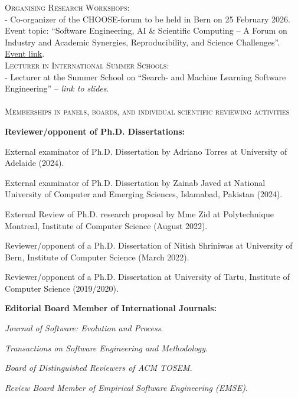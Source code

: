 \documentclass[11pt]{article}
\begin{document}
\textsc{Organising Research Workshops:}
\medskip \\ 
- Co-organizer of the CHOOSE-forum to be held in Bern on 25 February 2026. Event topic: ``Software Engineering, AI \& Scientific Computing -- A Forum on Industry and Academic Synergies, Reproducibility, and Science Challenges''. \href{https://se2026.inf.unibe.ch/en/choose-forum/}{Event link}.\\


\textsc{Lecturer in International Summer Schools:}
\medskip \\
- Lecturer at the Summer School on ``Search- and Machine Learning Software Engineering'' – \textit{link to slides}.\\

\medskip\medskip \\
\textsc{Memberships in panels, boards, and individual scientific reviewing activities}

\medskip 

\textbf{Reviewer/opponent of Ph.D. Dissertations:}
\begin{innerlist}
   \item External examinator of Ph.D. Dissertation by Adriano Torres at University of Adelaide (2024).
   \item External examinator of Ph.D. Dissertation by Zainab Javed at National University of Computer and Emerging Sciences, Islamabad, Pakistan (2024).
   \item External Review of Ph.D. research proposal by Mme Zid at Polytechnique Montreal, Institute of Computer Science (August 2022).
   \item Reviewer/opponent of a Ph.D. Dissertation of Nitish Shriniwas at University of Bern, Institute of Computer Science (March 2022).
   \item Reviewer/opponent of a Ph.D. Dissertation at University of Tartu, Institute of Computer Science (2019/2020).
\end{innerlist}

\medskip 

\textbf{Editorial Board Member of International Journals:}
\begin{innerlist}
   \item \emph{Journal of Software: Evolution and Process}.
   \item \emph{Transactions on Software Engineering and Methodology}.
   \item \emph{Board of Distinguished Reviewers of ACM TOSEM}.
   \item \emph{Review Board Member of Empirical Software Engineering (EMSE)}.
\end{innerlist}
\end{document}
